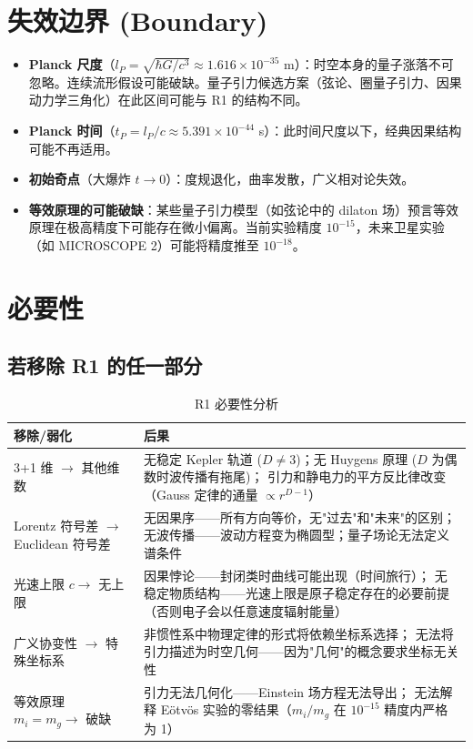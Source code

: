 \section{失效边界 (Boundary)}

\begin{limitbox}[R1 的已知失效边界]
  \begin{itemize}
    \item \textbf{Planck 尺度}（$l_P = \sqrt{\hbar G/c^3} \approx 1.616 \times 10^{-35}$ m）：时空本身的量子涨落不可忽略。连续流形假设可能破缺。量子引力候选方案（弦论、圈量子引力、因果动力学三角化）在此区间可能与 R1 的结构不同。
    \item \textbf{Planck 时间}（$t_P = l_P/c \approx 5.391 \times 10^{-44}$ s）：此时间尺度以下，经典因果结构可能不再适用。
    \item \textbf{初始奇点}（大爆炸 $t \rightarrow 0$）：度规退化，曲率发散，广义相对论失效。
    \item \textbf{等效原理的可能破缺}：某些量子引力模型（如弦论中的 dilaton 场）预言等效原理在极高精度下可能存在微小偏离。当前实验精度 $10^{-15}$，未来卫星实验（如 MICROSCOPE 2）可能将精度推至 $10^{-18}$。
  \end{itemize}
\end{limitbox}

\section{必要性}

\subsection{若移除 R1 的任一部分}

\begin{table}[h]
\centering
\small
\begin{tabular}{p{4cm}p{10cm}}
\toprule
\textbf{移除/弱化} & \textbf{后果} \\
\midrule
3+1 维 $\to$ 其他维数 &
无稳定 Kepler 轨道 ($D\neq 3$)；无 Huygens 原理 ($D$ 为偶数时波传播有拖尾)；
引力和静电力的平方反比律改变（Gauss 定律的通量 $\propto r^{D-1}$） \\
Lorentz 符号差 $\to$ Euclidean 符号差 &
无因果序——所有方向等价，无"过去"和"未来"的区别；
无波传播——波动方程变为椭圆型；量子场论无法定义谱条件 \\
光速上限 $c \to$ 无上限 &
因果悖论——封闭类时曲线可能出现（时间旅行）；
无稳定物质结构——光速上限是原子稳定存在的必要前提（否则电子会以任意速度辐射能量） \\
广义协变性 $\to$ 特殊坐标系 &
非惯性系中物理定律的形式将依赖坐标系选择；
无法将引力描述为时空几何——因为"几何"的概念要求坐标无关性 \\
等效原理 $m_i=m_g \to$ 破缺 &
引力无法几何化——Einstein 场方程无法导出；
无法解释 Eötvös 实验的零结果（$m_i/m_g$ 在 $10^{-15}$ 精度内严格为 1） \\
\bottomrule
\end{tabular}
\caption{R1 必要性分析}
\end{table}

